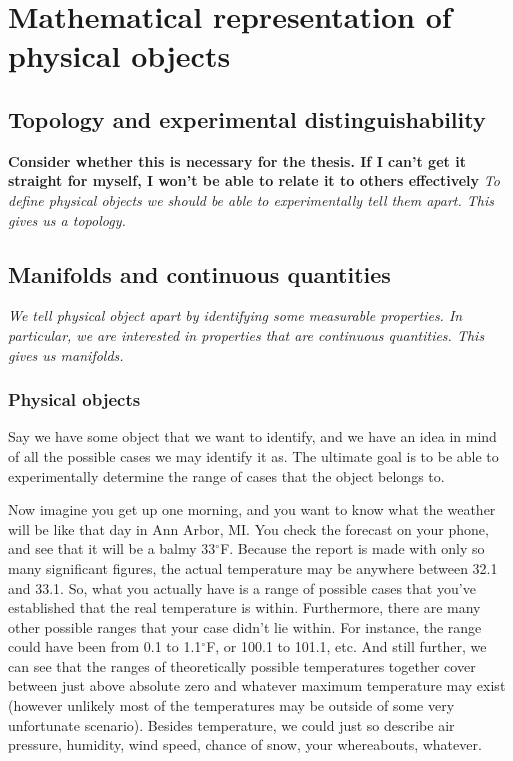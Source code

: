\documentclass{book}
\begin{document}
\tableofcontents

\chapter{Mathematical representation of physical objects}

\section{Topology and experimental distinguishability}
\textbf{Consider whether this is necessary for the thesis. If I can't get it straight for myself, I won't be able to relate it to others effectively}
\textit{To define physical objects we should be able to experimentally tell them apart. This gives us a topology.}

\section{Manifolds and continuous quantities}
\textit{We tell physical object apart by identifying some measurable properties. In particular, we are interested in properties that are continuous quantities. This gives us manifolds.}

\subsection{Physical objects}

Say we have some object that we want to identify, and we have an idea in mind of all the possible cases we may identify it as. The ultimate goal is to be able to experimentally determine the range of cases that the object belongs to. 
 
Now imagine you get up one morning, and you want to know what the weather will be like that day in Ann Arbor, MI. You check the forecast on your phone, and see that it will be a balmy 33$^{\circ}$F. Because the report is made with only so many significant figures, the actual temperature may be anywhere between 32.1 and 33.1. So, what you actually have is a range of possible cases that you've established that the real temperature is within. Furthermore, there are many other possible ranges that your case didn't lie within. For instance, the range could have been from 0.1 to 1.1$^{\circ}$F, or 100.1 to 101.1, etc. And still further, we can see that the ranges of theoretically possible temperatures together cover between just above absolute zero and whatever maximum temperature may exist (however unlikely most of the temperatures may be outside of some very unfortunate scenario). Besides temperature, we could just so describe air pressure, humidity, wind speed, chance of snow, your whereabouts, whatever. 
\end{document}
